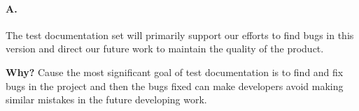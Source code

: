 \paragraph{A.}
The test documentation set will primarily support our efforts to find bugs in this version and direct our future work to maintain the quality of the product. 

\textbf{Why?}
Cause the most significant goal of test documentation is to find and fix bugs in the project and then the bugs fixed can make developers avoid making similar mistakes in the future developing work.